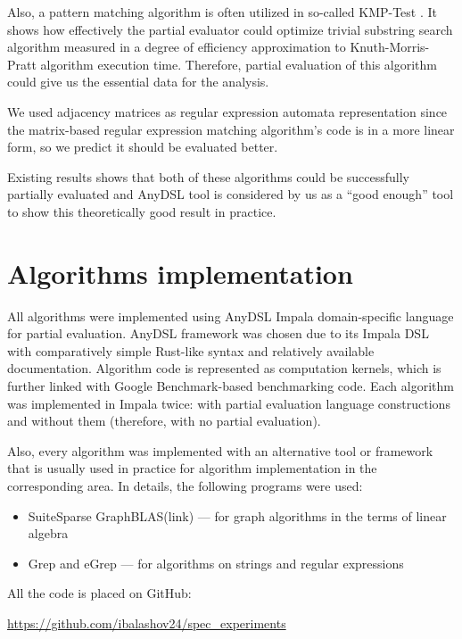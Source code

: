\documentclass[conference]{IEEEtran}
\begin{document}
Also, a pattern matching algorithm is often utilized in so-called KMP-Test \cite{jones1993partial}. It shows how effectively the partial evaluator could optimize trivial substring search algorithm measured in a degree of efficiency approximation to Knuth-Morris-Pratt algorithm execution time. Therefore, partial evaluation of this algorithm could give us the essential data for the analysis.

We used adjacency matrices as regular expression automata representation since the matrix-based regular expression matching algorithm's code is in a more linear form, so we predict it should be evaluated better.

Existing results \cite{jones1993partial} shows that both of these algorithms could be successfully partially evaluated and AnyDSL tool is considered by us as a ``good enough'' tool to show this theoretically good result in practice.

\section{Algorithms implementation}

All algorithms were implemented using AnyDSL Impala domain-specific language \cite{leissa2018anydsl} for partial evaluation. AnyDSL framework was chosen due to its Impala DSL with comparatively simple Rust-like syntax and relatively available documentation. Algorithm code is represented as computation kernels, which is further linked with Google Benchmark-based \cite{gbenchmark} benchmarking code. Each algorithm was implemented in Impala twice: with partial evaluation language constructions and without them (therefore, with no partial evaluation).

Also, every algorithm was implemented with an alternative tool or framework that is usually used in practice for algorithm implementation in the corresponding area. In details, the following programs were used:
\begin{itemize}
	\item SuiteSparse GraphBLAS(link) --- for graph algorithms in the terms of linear algebra
	\item Grep and eGrep --- for algorithms on strings and regular expressions
\end{itemize}


All the code is placed on GitHub:
\begin{center}
\href{https://github.com/ibalashov24/spec\_experiments}{https://github.com/ibalashov24/spec\_experiments}
\end{center}
\end{document}
